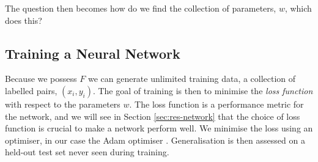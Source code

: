 The question then becomes how do we find the collection of parameters, $w$, which does this?

\subsection{Training a Neural Network}
Because we possess $F$ we can generate unlimited training data, a collection of labelled pairs, $(x_i,y_i)$. The goal of training is then to minimise the \emph{loss function} with respect to the parameters $w$. The loss function is a performance metric for the network, and we will see in Section \ref{sec:res-network} that the choice of loss function is crucial to make a network perform well.
We minimise the loss using an optimiser, in our case the Adam optimiser \cite{kingma2017}. Generalisation is then assessed on a held-out test set never seen during training.
